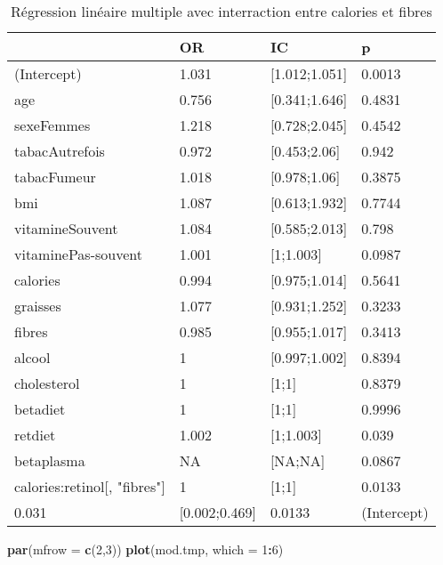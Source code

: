 \documentclass[]{article}
\newenvironment{Shaded}{\begin{snugshade}}{\end{snugshade}}
\newcommand{\KeywordTok}[1]{\textcolor[rgb]{0.13,0.29,0.53}{\textbf{#1}}}
\newcommand{\DataTypeTok}[1]{\textcolor[rgb]{0.13,0.29,0.53}{#1}}
\newcommand{\DecValTok}[1]{\textcolor[rgb]{0.00,0.00,0.81}{#1}}
\newcommand{\OperatorTok}[1]{\textcolor[rgb]{0.81,0.36,0.00}{\textbf{#1}}}
\newcommand{\NormalTok}[1]{#1}
\begin{document}
\begin{table}

\caption{\label{tab:unnamed-chunk-88}Régression linéaire multiple avec interraction entre calories et fibres}
\centering
\begin{tabular}[t]{l|l|l|l}
\hline
  & OR & IC & p\\
\hline
\rowcolor[HTML]{BBD2E1}  (Intercept) & 1.031 & [1.012;1.051] & 0.0013\\
\hline
age & 0.756 & [0.341;1.646] & 0.4831\\
\hline
\rowcolor[HTML]{BBD2E1}  sexeFemmes & 1.218 & [0.728;2.045] & 0.4542\\
\hline
tabacAutrefois & 0.972 & [0.453;2.06] & 0.942\\
\hline
\rowcolor[HTML]{BBD2E1}  tabacFumeur & 1.018 & [0.978;1.06] & 0.3875\\
\hline
bmi & 1.087 & [0.613;1.932] & 0.7744\\
\hline
\rowcolor[HTML]{BBD2E1}  vitamineSouvent & 1.084 & [0.585;2.013] & 0.798\\
\hline
vitaminePas-souvent & 1.001 & [1;1.003] & 0.0987\\
\hline
\rowcolor[HTML]{BBD2E1}  calories & 0.994 & [0.975;1.014] & 0.5641\\
\hline
graisses & 1.077 & [0.931;1.252] & 0.3233\\
\hline
\rowcolor[HTML]{BBD2E1}  fibres & 0.985 & [0.955;1.017] & 0.3413\\
\hline
alcool & 1 & [0.997;1.002] & 0.8394\\
\hline
\rowcolor[HTML]{BBD2E1}  cholesterol & 1 & [1;1] & 0.8379\\
\hline
betadiet & 1 & [1;1] & 0.9996\\
\hline
\rowcolor[HTML]{BBD2E1}  retdiet & 1.002 & [1;1.003] & 0.039\\
\hline
betaplasma & NA & [NA;NA] & 0.0867\\
\hline
\rowcolor[HTML]{BBD2E1}  calories:retinol[, "fibres"] & 1 & [1;1] & 0.0133\\
\hline
0.031 & [0.002;0.469] & 0.0133 & (Intercept)\\
\hline
\end{tabular}
\end{table}

\begin{Shaded}
\begin{Highlighting}[]
\KeywordTok{par}\NormalTok{(}\DataTypeTok{mfrow =} \KeywordTok{c}\NormalTok{(}\DecValTok{2}\NormalTok{,}\DecValTok{3}\NormalTok{))}
\KeywordTok{plot}\NormalTok{(mod.tmp, }\DataTypeTok{which =} \DecValTok{1}\OperatorTok{:}\DecValTok{6}\NormalTok{)}
\end{Highlighting}
\end{Shaded}
\end{document}

